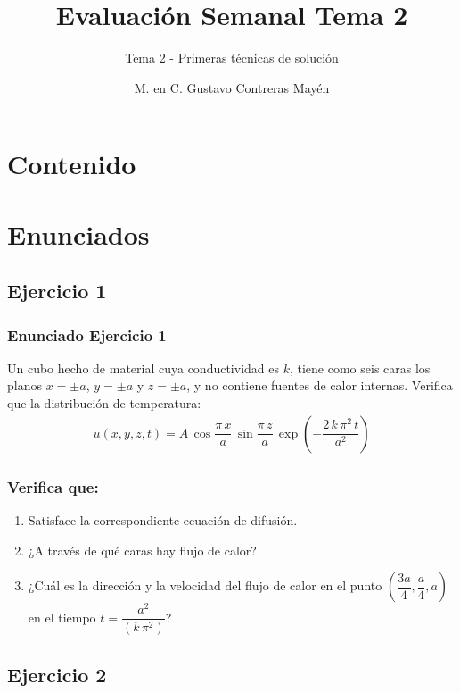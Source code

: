 \documentclass[12pt]{beamer}
\title{\large{Evaluación Semanal Tema 2}}
\subtitle{Tema 2 - Primeras técnicas de solución}
\author{M. en C. Gustavo Contreras Mayén}
\date{}
\begin{document}
\maketitle
\fontsize{14}{14}\selectfont
{}

\section*{Contenido}

\section{Enunciados}
\subsection{Ejercicio 1}

\begin{frame}
\frametitle{Enunciado Ejercicio 1}
Un cubo hecho de material cuya conductividad es $k$, tiene como seis caras los planos $x = \pm a$, $y = \pm a$ y $z = \pm a$, y no contiene fuentes de calor internas. Verifica que la distribución de temperatura:
\begin{align*}
u (x, y, z, t) = A \, \cos \dfrac{\pi \, x}{a} \, \sin \dfrac{\pi \, z}{a} \, \exp \left( - \dfrac{2 \, k \, \pi^{2} \, t}{a^{2}} \right)
\end{align*}
\end{frame}

\begin{frame}
\frametitle{Verifica que:}
\begin{enumerate}[<+->]
\item Satisface la correspondiente ecuación de difusión.
\item ¿A través de qué caras hay flujo de calor?
\item ¿Cuál es la dirección y la velocidad del flujo de calor en el punto \hfill \break $\left(\dfrac{3 a}{4}, \dfrac{a}{4}, a \right)$ en el tiempo $t = \dfrac{a^{2}}{(k \, \pi^{2})}$?
\end{enumerate}
\end{frame}

\subsection{Ejercicio 2}
\end{document}
